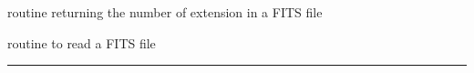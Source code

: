 \begin{related}
  \begin{sulist}{} %
  \item[\htmlref{getnumext\_fits}{sub:getnumext_fits}] routine returning the number of extension in a FITS
  file
  \item[\htmlref{input\_map}{sub:input_map}] routine to read a \healpix FITS file
  \end{sulist}
\end{related}

\rule{\hsize}{2mm}

\newpage
